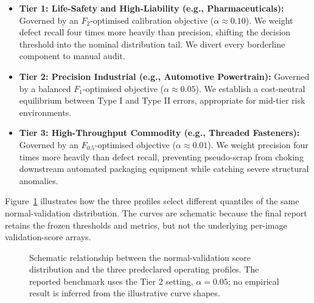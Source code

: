 \begin{itemize}[leftmargin=1.5em]
    \item \textbf{Tier 1: Life-Safety and High-Liability (e.g., Pharmaceuticals):} Governed by an $F_2$-optimised calibration objective ($\alpha \approx 0.10$). We weight defect recall four times more heavily than precision, shifting the decision threshold into the nominal distribution tail. We divert every borderline component to manual audit.
    \item \textbf{Tier 2: Precision Industrial (e.g., Automotive Powertrain):} Governed by a balanced $F_1$-optimised objective ($\alpha \approx 0.05$). We establish a cost-neutral equilibrium between Type I and Type II errors, appropriate for mid-tier risk environments.
    \item \textbf{Tier 3: High-Throughput Commodity (e.g., Threaded Fasteners):} Governed by an $F_{0.5}$-optimised objective ($\alpha \approx 0.01$). We weight precision four times more heavily than defect recall, preventing pseudo-scrap from choking downstream automated packaging equipment while catching severe structural anomalies.
\end{itemize}

Figure~\ref{fig:threshold_calibration} illustrates how the three profiles select different quantiles of the same normal-validation distribution. The curves are schematic because the final report retains the frozen thresholds and metrics, but not the underlying per-image validation-score arrays.

\begin{figure}[tp]
    \centering
    \resizebox{\linewidth}{!}{%
    }
    \caption{Schematic relationship between the normal-validation score distribution and the three predeclared operating profiles. The reported benchmark uses the Tier 2 setting, $\alpha=0.05$; no empirical result is inferred from the illustrative curve shapes.}
    \label{fig:threshold_calibration}
\end{figure}
